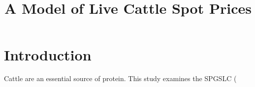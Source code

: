 \documentclass[11pt]{amsart}
\title{A Model of Live Cattle Spot Prices}
\begin{document}
\maketitle

\section{Introduction}
Cattle are an essential source of protein. This study examines the SPGSLC (
\end{document}
